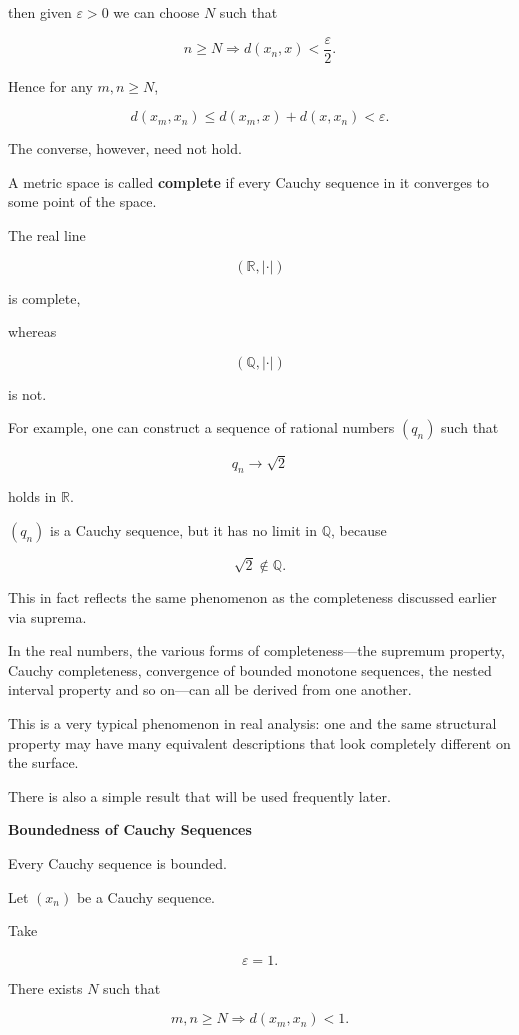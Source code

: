 \documentclass[11pt]{article}
\begin{document}
then given $\varepsilon>0$ we can choose $N$ such that

\[
n\geq N\Longrightarrow d(x_{n},x)<\frac{\varepsilon}{2}.
\]

Hence for any $m,n\geq N$,

\[
d(x_{m},x_{n})\leq d(x_{m},x)+d(x,x_{n})<\varepsilon.
\]

The converse, however, need not hold.

A metric space is called \textbf{complete} if every Cauchy sequence in it converges to some point of the space.

The real line

\[
(\mathbb{R},|\cdot|)
\]

is complete,

whereas

\[
(\mathbb{Q},|\cdot|)
\]

is not.

For example, one can construct a sequence of rational numbers $(q_{n})$ such that

\[
q_{n}\rightarrow\sqrt{2}
\]

holds in $\mathbb{R}$.

$(q_{n})$ is a Cauchy sequence, but it has no limit in $\mathbb{Q}$, because

\[
\sqrt{2}\notin\mathbb{Q}.
\]

This in fact reflects the same phenomenon as the completeness discussed earlier via suprema.

In the real numbers, the various forms of completeness---the supremum property, Cauchy completeness, convergence of bounded monotone sequences, the nested interval property and so on---can all be derived from one another.

This is a very typical phenomenon in real analysis: one and the same structural property may have many equivalent descriptions that look completely different on the surface.

There is also a simple result that will be used frequently later.

\textbf{Boundedness of Cauchy Sequences}

Every Cauchy sequence is bounded.

Let $(x_{n})$ be a Cauchy sequence.

Take

\[
\varepsilon=1.
\]

There exists $N$ such that

\[
m,n\geq N\Longrightarrow d(x_{m},x_{n})<1.
\]
\end{document}
